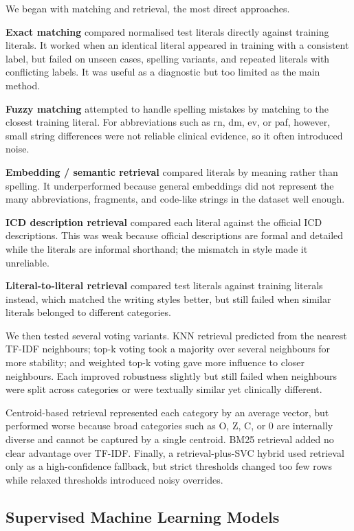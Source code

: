 \documentclass[9pt,a4paper,twoside]{utils/tau-class/tau}
\begin{document}
We began with matching and retrieval, the most direct approaches.

\textbf{Exact matching} compared normalised test literals directly against training literals. It worked when an identical literal appeared in training with a consistent label, but failed on unseen cases, spelling variants, and repeated literals with conflicting labels. It was useful as a diagnostic but too limited as the main method.

\textbf{Fuzzy matching} attempted to handle spelling mistakes by matching to the closest training literal. For abbreviations such as rn, dm, ev, or paf, however, small string differences were not reliable clinical evidence, so it often introduced noise.

\textbf{Embedding / semantic retrieval} compared literals by meaning rather than spelling. It underperformed because general embeddings did not represent the many abbreviations, fragments, and code-like strings in the dataset well enough.

\textbf{ICD description retrieval} compared each literal against the official ICD descriptions. This was weak because official descriptions are formal and detailed while the literals are informal shorthand; the mismatch in style made it unreliable.

\textbf{Literal-to-literal retrieval} compared test literals against training literals instead, which matched the writing styles better, but still failed when similar literals belonged to different categories.

We then tested several voting variants. KNN retrieval predicted from the nearest TF-IDF neighbours; top-k voting took a majority over several neighbours for more stability; and weighted top-k voting gave more influence to closer neighbours. Each improved robustness slightly but still failed when neighbours were split across categories or were textually similar yet clinically different.

Centroid-based retrieval represented each category by an average vector, but performed worse because broad categories such as O, Z, C, or 0 are internally diverse and cannot be captured by a single centroid. BM25 retrieval added no clear advantage over TF-IDF. Finally, a retrieval-plus-SVC hybrid used retrieval only as a high-confidence fallback, but strict thresholds changed too few rows while relaxed thresholds introduced noisy overrides.

\subsection{Supervised Machine Learning Models}
\end{document}
